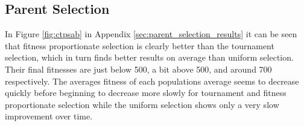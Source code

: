 

\subsection{Parent Selection} %
\label{sub:parent_selection}

In Figure \ref{fig:ctpsab} in Appendix \ref{sec:parent_selection_results} it can be seen that fitness proportionate selection is clearly better than the tournament selection, which in turn finds better results on average than uniform selection. Their final fitnesses are just below 500, a bit above 500, and around 700 respectively. The averages fitness of each populations average seems to decrease quickly before beginning to decrease more slowly for tournament and fitness proportionate selection while the uniform selection shows only a very slow improvement over time.




